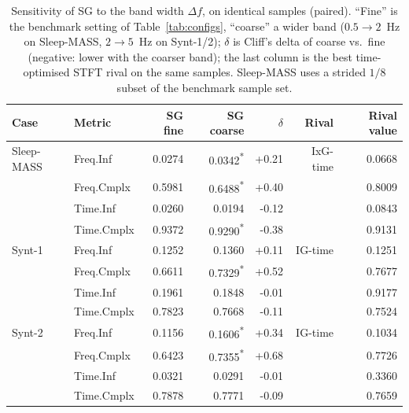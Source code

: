 \begin{table}[t]
\centering
\setlength{\tabcolsep}{2pt}
\caption{Sensitivity of SG to the band width $\Delta f$, on identical samples (paired). ``Fine'' is the benchmark setting of Table~\ref{tab:configs}, ``coarse'' a wider band ($0.5 \to 2$~Hz on Sleep-MASS, $2 \to 5$~Hz on Synt-1/2); $\delta$ is Cliff's delta of coarse vs.\ fine (negative: lower with the coarser band); the last column is the best time-optimised STFT rival on the same samples. Sleep-MASS uses a strided $1/8$ subset of the benchmark sample set.}
\label{tab:dftest}
\begin{tabular}{@{}llrrrrr@{}}
\toprule
\textbf{Case} & \textbf{Metric} & \textbf{SG fine} & \textbf{SG coarse} & $\delta$ & \textbf{Rival} & \textbf{Rival value} \\
\midrule
Sleep-MASS & Freq.Inf & 0.0274 & 0.0342\textsuperscript{*} & +0.21 & IxG-time & 0.0668 \\
 & Freq.Cmplx & 0.5981 & 0.6488\textsuperscript{*} & +0.40 &  & 0.8009 \\
 & Time.Inf & 0.0260 & 0.0194 & -0.12 &  & 0.0843 \\
 & Time.Cmplx & 0.9372 & 0.9290\textsuperscript{*} & -0.38 &  & 0.9131 \\
\addlinespace
Synt-1 & Freq.Inf & 0.1252 & 0.1360 & +0.11 & IG-time & 0.1251 \\
 & Freq.Cmplx & 0.6611 & 0.7329\textsuperscript{*} & +0.52 &  & 0.7677 \\
 & Time.Inf & 0.1961 & 0.1848 & -0.01 &  & 0.9177 \\
 & Time.Cmplx & 0.7823 & 0.7668 & -0.11 &  & 0.7524 \\
\addlinespace
Synt-2 & Freq.Inf & 0.1156 & 0.1606\textsuperscript{*} & +0.34 & IG-time & 0.1034 \\
 & Freq.Cmplx & 0.6423 & 0.7355\textsuperscript{*} & +0.68 &  & 0.7726 \\
 & Time.Inf & 0.0321 & 0.0291 & -0.01 &  & 0.3360 \\
 & Time.Cmplx & 0.7878 & 0.7771 & -0.09 &  & 0.7659 \\
\bottomrule
\end{tabular}
\end{table}
